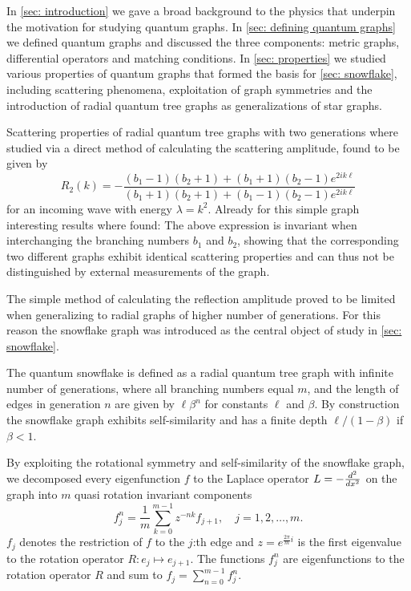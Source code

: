 In \cref{sec: introduction} we gave a broad background to the physics that underpin the motivation for studying quantum graphs. In \cref{sec: defining quantum graphs} we defined quantum graphs and discussed the three components: metric graphs, differential operators and matching conditions. In \cref{sec: properties} we studied various properties of quantum graphs that formed the basis for \cref{sec: snowflake}, including scattering phenomena, exploitation of graph symmetries and the introduction of radial quantum tree graphs as generalizations of star graphs.

Scattering properties of radial quantum tree graphs with two generations where studied via a direct method of calculating the scattering amplitude, found to be given by
\[
  R_2(k) = -\frac{(b_1-1) (b_2+1)+(b_1+1) (b_2-1) e^{2 i k \ell}}{(b_1+1) (b_2+1)+(b_1-1) (b_2-1) e^{2 i k \ell}}
\]
for an incoming wave with energy $\lambda = k^2$.
Already for this simple graph interesting results where found: The above expression is invariant when interchanging the branching numbers $b_1$ and $b_2$, showing that the corresponding two different graphs exhibit identical scattering properties and can thus not be distinguished by external measurements of the graph.

The simple method of calculating the reflection amplitude proved to be limited when generalizing to radial graphs of higher number of generations. For this reason the snowflake graph was introduced as the central object of study in \cref{sec: snowflake}.

The quantum snowflake is defined as a radial quantum tree graph with infinite number of generations, where all branching numbers equal $m$, and the length of edges in generation $n$ are given by $\ell\beta^n$ for constants $\ell$ and $\beta$. By construction the snowflake graph exhibits self-similarity and has a finite depth $\ell/(1-\beta)$ if $\beta < 1$.

By exploiting the rotational symmetry and self-similarity of the snowflake graph, we decomposed every eigenfunction $f$ to the Laplace operator $L=-\frac{d^2}{dx^2}$ on the graph into $m$ quasi rotation invariant components
\[
  f^n_j = \frac{1}{m} \sum_{k=0}^{m-1} z^{-nk} f_{j+1}, \quad j=1,2,\ldots,m.
\]
$f_j$ denotes the restriction of $f$ to the $j$:th edge and $z=e^{\frac{2\pi}{m}i}$ is the first eigenvalue to the rotation operator $R: e_j \mapsto e_{j+1}$.
The functions $f^n_j$ are eigenfunctions to the rotation operator $R$ and sum to $f_j = \sum_{n=0}^{m-1} f_j^n$.

